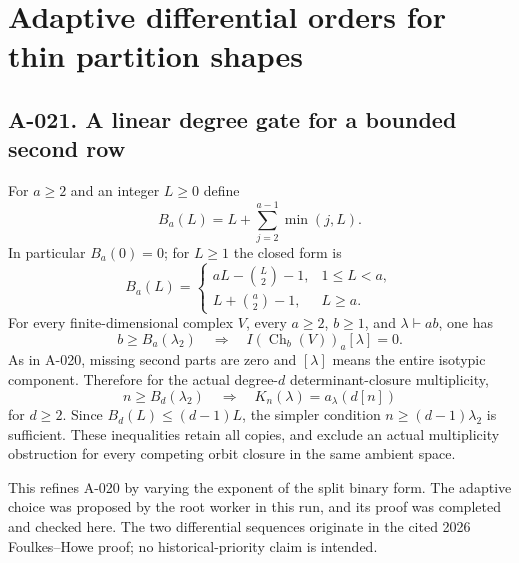\section{Adaptive differential orders for thin partition shapes}

\subsection*{A-021. A linear degree gate for a bounded second row}
For $a\geq2$ and an integer $L\geq0$ define
\[
 B_a(L)=L+\sum_{j=2}^{a-1}\min(j,L).                    \tag{A-021.1}
\]
In particular $B_a(0)=0$; for $L\geq1$ the closed form is
\[
 B_a(L)=
 \begin{cases}
 aL-\binom L2-1,&1\leq L<a,\\
 L+\binom a2-1,&L\geq a.
 \end{cases}                                          \tag{A-021.2}
\]
For every finite-dimensional complex $V$, every $a\geq2$,
$b\geq1$, and $\lambda\vdash ab$, one has
\[
 b\geq B_a(\lambda_2)
 \quad\Longrightarrow\quad
 I(\operatorname{Ch}_b(V))_a[\lambda]=0.                \tag{A-021.3}
\]
As in A-020, missing second parts are zero and $[\lambda]$
means the entire isotypic component. Therefore for the actual
degree-$d$ determinant-closure multiplicity,
\[
 n\geq B_d(\lambda_2)
 \quad\Longrightarrow\quad
                K_n(\lambda)=a_\lambda(d[n])            \tag{A-021.4}
\]
for $d\geq2$. Since $B_d(L)\leq(d-1)L$, the simpler condition
$n\geq(d-1)\lambda_2$ is sufficient. These inequalities retain
all copies, and exclude an actual multiplicity obstruction for
every competing orbit closure in the same ambient space.

This refines A-020 by varying the exponent of the split binary
form. The adaptive choice was proposed by the root worker in
this run, and its proof was completed and checked here.
The two differential sequences originate in the cited 2026
Foulkes--Howe proof; no historical-priority claim is intended.

